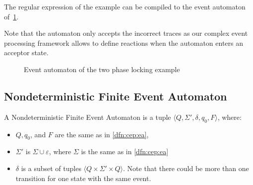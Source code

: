 	
			The regular expression of the example can be compiled to the event automaton of~\cref{fig:cep:fa}. 
	
			Note that the automaton only accepts the incorrect traces as our complex event processing framework allows to define reactions when the automaton enters an acceptor state.
			
				
				\begin{figure}[h]
					\centering
					\caption{Event automaton of the two phase locking example}
					\label{fig:cep:fa}
				\end{figure}

			

		\subsection{Nondeterministic Finite Event Automaton}
		
		\begin{dfn}	
			\label{dfn:cep:nea}
			A Nondeterministic Finite Event Automaton is a tuple $\langle Q,\Sigma',\delta,q_0, F \rangle$, where:
			\begin{itemize}
				\item $Q, q_0$, and $F$ are the same as in \cref{dfn:cep:ea},
				\item $\Sigma'$ is $\Sigma \cup \varepsilon$, where $\Sigma$ is the same as in \cref{dfn:cep:ea}
				\item $\delta$ is a subset of tuples $\langle Q \times \Sigma' \times Q \rangle$.
				Note that there could be more than one transition for one state with the same event.
			\end{itemize}
		\end{dfn}
	
